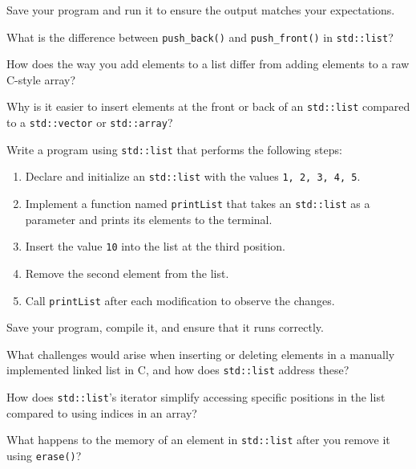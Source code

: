 \begin{challenge}
\begin{task}
        Save your program and run it to ensure the output matches your expectations.

        \begin{questions}
            \item What is the difference between \texttt{push_back()} and \texttt{push_front()} in \texttt{std::list}?
            \item How does the way you add elements to a list differ from adding elements to a raw C-style array?
            \item Why is it easier to insert elements at the front or back of an \texttt{std::list} compared to a \texttt{std::vector} or \texttt{std::array}?
        \end{questions}
    \end{task}

    \begin{task}
        Write a program using \texttt{std::list} that performs the following steps:
        \begin{enumerate}
            \item Declare and initialize an \texttt{std::list} with the values \texttt{1, 2, 3, 4, 5}.
            \item Implement a function named \texttt{printList} that takes an \texttt{std::list} as a parameter and prints its elements to the terminal.
            \item Insert the value \texttt{10} into the list at the third position.
            \item Remove the second element from the list.
            \item Call \texttt{printList} after each modification to observe the changes.
        \end{enumerate}

        Save your program, compile it, and ensure that it runs correctly.

        \begin{questions}
            \item What challenges would arise when inserting or deleting elements in a manually implemented linked list in C, and how does \texttt{std::list} address these?
            \item How does \texttt{std::list}'s iterator simplify accessing specific positions in the list compared to using indices in an array?
            \item What happens to the memory of an element in \texttt{std::list} after you remove it using \texttt{erase()}?
        \end{questions}
    \end{task}


\end{challenge}
